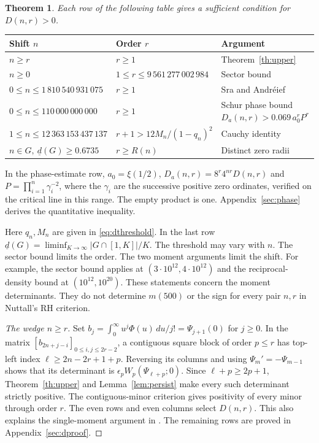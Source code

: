 \documentclass[11pt,a4paper,reqno]{amsart}
\newtheorem{theorem}{Theorem}[section]
\numberwithin{equation}{section}
\begin{document}
\begin{theorem}\label{th:regions}
Each row of the following table gives a sufficient condition for \(D(n,r)>0\).
\end{theorem}
\begin{center}\small
\begin{tabular}{@{}lll@{}}
\toprule
Shift \(n\) & Order \(r\) & Argument\\
\midrule
\(n\ge r\) & \(r\ge1\) & Theorem~\ref{th:upper}\\
\(n\ge0\) & \(1\le r\le9\,561\,277\,002\,984\) & Sector bound\\
\(0\le n\le1\,810\,540\,931\,075\) & \(r\ge1\) & Sra and Andréief\\
\(0\le n\le110\,000\,000\,000\) & \(r\ge1\) & \shortstack[l]{Schur phase bound\\[2pt]\(D_a(n,r)>0.069\,a_0^rP^r\)}\\
\(1\le n\le12\,363\,153\,437\,137\) & \(r+1>12M_n/(1-q_n)^2\) & Cauchy identity\\
\(n\in G,\ \underline d(G)\ge0.6735\) & \(r\ge R(n)\) & Distinct zero radii\\
\bottomrule
\end{tabular}
\end{center}
In the phase-estimate row, \(a_0=\xi(1/2)\), \(D_a(n,r)=8^r4^{nr}D(n,r)\) and \(P=\prod_{i=1}^n\gamma_i^{-2}\), where the \(\gamma_i\) are the successive positive zero ordinates, verified on the critical line in this range. The empty product is one. Appendix~\ref{sec:phase} derives the quantitative inequality.

Here \(q_n,M_n\) are given in \eqref{eq:dthreshold}. In the last row \(\underline d(G)=\liminf_{K\to\infty}|G\cap[1,K]|/K\). The threshold may vary with \(n\). The sector bound limits the order. The two moment arguments limit the shift. For example, the sector bound applies at \((3\cdot10^{12},4\cdot10^{12})\) and the reciprocal-density bound at \((10^{12},10^{20})\). These statements concern the moment determinants. They do not determine \(m(500)\) or the sign for every pair \(n,r\) in Nuttall's RH criterion.

\begin{proof}[The wedge \(n\ge r\)]
Set \(b_j=\int_0^\infty u^j\Phi(u)\,du/j!=\Psi_{j+1}(0)\) for \(j\ge0\). In the matrix \([b_{2n+j-i}]_{0\le i,j\le2r-2}\), a contiguous square block of order \(p\le r\) has top-left index \(\ell\ge2n-2r+1+p\). Reversing its columns and using \(\Psi_m'=-\Psi_{m-1}\) shows that its determinant is \(\epsilon_p W_p(\Psi_{\ell+p};0)\). Since \(\ell+p\ge2p+1\), Theorem~\ref{th:upper} and Lemma~\ref{lem:persist} make every such determinant strictly positive. The contiguous-minor criterion \cite[Lemma~2.4]{fjs} gives positivity of every minor through order \(r\). The even rows and even columns select \(D(n,r)\). This also explains the single-moment argument in \cite[(3.21)--(3.23)]{moment}. The remaining rows are proved in Appendix~\ref{sec:dproof}.
\end{proof}
\end{document}
